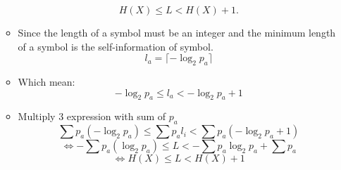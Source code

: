 \begin{enumerate}[label=\textbf{\Alph*.}]
\begin{itemize}
            \[
                H(X) \leq L < H(X) + 1.
            \]
            \item Since the length of a symbol must be an integer and the minimum length of a symbol is the self-information of symbol.
            \[
                l_a = \lceil -\log_2 p_a \rceil
            \]
            \item Which mean:
            \[
                -\log_2 p_a \leq l_a < -\log_2 p_a + 1
            \]
            \item Multiply 3 expression with sum of $p_a$
            \[
                \sum p_a (-\log_2 p_a) \leq \sum p_a l_i < \sum p_a (-\log_2 p_a + 1)
            \]
            \[
                \Leftrightarrow -\sum p_a (\log_2 p_a) \leq L < -\sum p_a \log_2 p_a + \sum p_a
            \]
            \[
                \Leftrightarrow H(X) \leq L < H(X) + 1
            \]
        \end{itemize}
    \end{enumerate}
    
